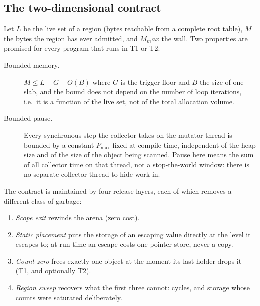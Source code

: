 \begin{table}[t]
\centering
\small
{}
\caption{Tier assignment. The last two rows are the ones that emit a runtime; T0 and the idle case
emit none. \S\
ef{sec:formal} gives the soundness statement for each row.}
\label{tab:tiers}
\end{table}

\subsection{The two-dimensional contract}
\label{sec:contract}

Let $L$ be the live set of a region (bytes reachable from a complete root table), $M$ the
bytes the region has ever admitted, and $M_max$ the wall.
Two properties are promised for every program that runs in T1 or T2:

\begin{description}
\item[Bounded memory.] $M \le L + G + O(B)$ where $G$ is the trigger floor and $B$
  the size of one slab, and the bound does not depend on the number of loop iterations, i.e.~it is a
  function of the live set, not of the total allocation volume.
\item[Bounded pause.] Every synchronous step the collector takes on the mutator thread is bounded by
  a constant $P_{\max}$ fixed at compile time, independent of the heap size and of the size of
  the object being scanned. Pause here means the sum of all collector time on that thread, not a
  stop-the-world window: there is no separate collector thread to hide work in.
\end{description}

The contract is maintained by four release layers, each of which removes a different class of
garbage:
\begin{enumerate}
\item \emph{Scope exit} rewinds the arena (zero cost).
\item \emph{Static placement} puts the storage of an escaping value directly at the level it
  escapes to; at run time an escape costs one pointer store, never a copy.
\item \emph{Count zero} frees exactly one object at the moment its last holder drops it (T1, and
  optionally T2).
\item \emph{Region sweep} recovers what the first three cannot: cycles, and storage whose counts were
  saturated deliberately.
\end{enumerate}

